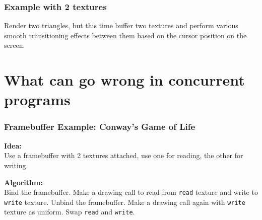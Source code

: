 \documentclass{beamer}
\begin{document}
%
%
%
\begin{frame}
\frametitle{Example with 2 textures}
Render two triangles, but this time buffer two textures and perform various
smooth transitioning effects between them based on the cursor position
on the screen.
\end{frame}


\section{What can go wrong in concurrent programs}
%
%
%




%
%
%
\begin{frame}
\frametitle{Framebuffer Example: Conway's Game of Life}
\textbf{Idea:}\\
Use a framebuffer with 2 textures attached, use one for reading,
the other for writing.\\\vspace{4mm}

\textbf{Algorithm:}\\
Bind the framebuffer. Make a drawing call to read from \texttt{read}
texture and write to \texttt{write} texture. Unbind the framebuffer.
Make a drawing call again with \texttt{write} texture as uniform.
Swap \texttt{read} and \texttt{write}.
\end{frame}
\end{document}
